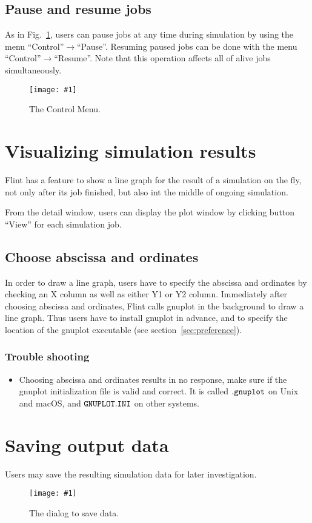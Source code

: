 \documentclass[a4paper,10pt]{report}
\newcommand\FigureOfImage[2]{\begin{figure}[h]
  \centering
  \texttt{[image: \#1]}
  \caption{#2}\label{fig:#1}
\end{figure}}
\begin{document}
\subsection{Pause and resume jobs}
As in Fig.~\ref{fig:control}, users can pause jobs at any time during simulation
by using the menu ``Control''$\rightarrow$``Pause''. Resuming paused jobs can
be done with the menu ``Control''$\rightarrow$``Resume''.
Note that this operation affects all of alive jobs simultaneously.
\FigureOfImage{control}{The Control Menu.}

\section{Visualizing simulation results}
Flint has a feature to show a line graph for the result of a simulation on the
fly, not only after its job finished, but also int the middle of ongoing
simulation.

From the detail window, users can display the plot window by clicking button
``View'' for each simulation job.

\subsection{Choose abscissa and ordinates}
In order to draw a line graph, users have to specify the abscissa and ordinates
by checking an X column as well as either Y1 or Y2 column.
Immediately after choosing abscissa and ordinates, Flint calls gnuplot in the
background to draw a line graph.
Thus users have to install gnuplot in advance, and to specify the location of
the gnuplot executable (see section~\ref{sec:preference}).

\subsubsection{Trouble shooting}
\begin{itemize}
\item Choosing abscissa and ordinates results in no response, make sure if the
  gnuplot initialization file is valid and correct.
  It is called $\tt{.gnuplot}$ on Unix and macOS, and $\tt{GNUPLOT.INI}$ on
  other systems.
\end{itemize}

\section{Saving output data}
Users may save the resulting simulation data for later investigation.
\FigureOfImage{lr-export}{The dialog to save data.}
\end{document}
